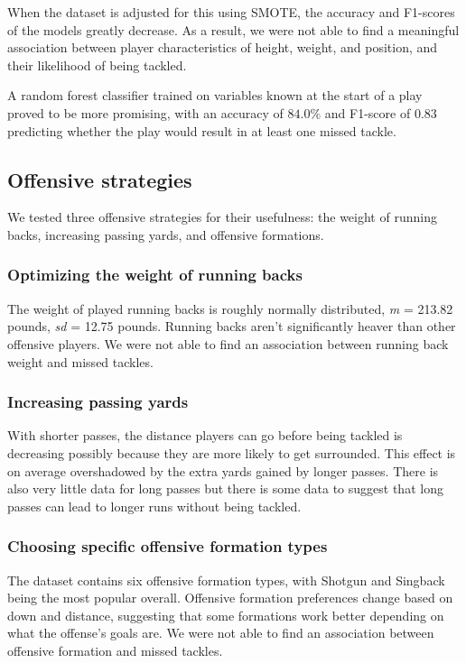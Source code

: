 \documentclass[bibtex, sigconf, hyperref={colorlinks=true,linkcolor=blue,urlcolor=blue}]{acmart}
\begin{document}
When the dataset is adjusted for this using SMOTE, the accuracy and F1-scores
of the models greatly decrease. As a result, we were not able to find a
meaningful association between player characteristics of height, weight, and
position, and their likelihood of being tackled.

A random forest classifier trained on variables known at the start of a play
proved to be more promising, with an accuracy of $84.0\%$ and F1-score of $0.83$
predicting whether the play would result in at least one missed tackle.

\subsection{Offensive strategies}

We tested three offensive strategies for their usefulness:
the weight of running backs, increasing passing yards, and offensive formations.

\subsubsection{Optimizing the weight of running backs}

The weight of played running backs is roughly normally distributed, \textit{m} =
213.82 pounds, \textit{sd} = 12.75 pounds. Running backs aren't significantly
heaver than other offensive players. We were not able to find an association
between running back weight and missed tackles.

\subsubsection{Increasing passing yards}

With shorter passes, the distance players can go before being tackled is
decreasing possibly because they are more likely to get surrounded. This effect
is on average overshadowed by the extra yards gained by longer passes.
There is also very little data for long passes but there is some data to suggest
that long passes can lead to longer runs without being tackled.

\subsubsection{Choosing specific offensive formation types}

The dataset contains six offensive formation types, with Shotgun and
Singback being the most popular overall. Offensive formation preferences change
based on down and distance, suggesting that some formations work better
depending on what the offense's goals are. We were not able to find an
association between offensive formation and missed tackles.
\end{document}
